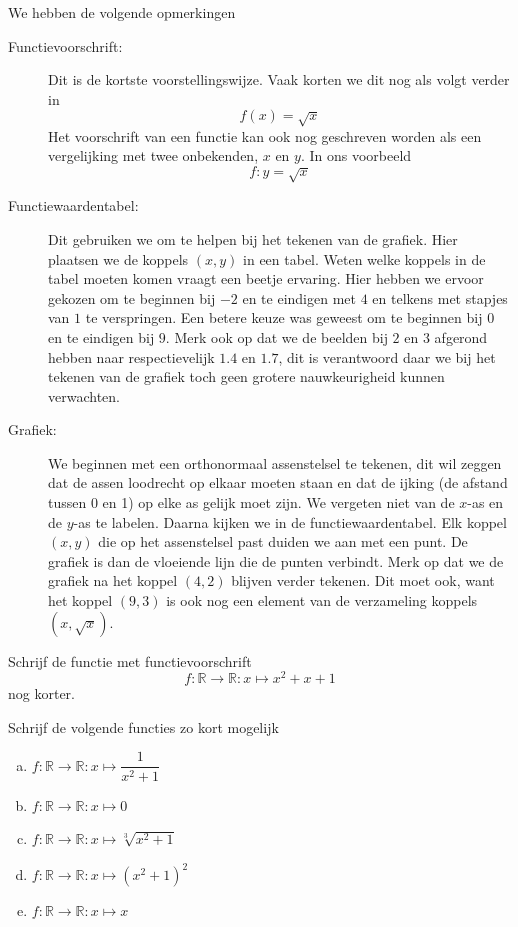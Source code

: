 \documentclass[12pt,a4paper,twoside]{article}
\begin{document}
We hebben de volgende opmerkingen
\begin{description}
\item[Functievoorschrift:] Dit is de kortste voorstellingswijze. Vaak korten we dit nog als volgt verder in
  $$f(x)=\sqrt{x}$$
  Het voorschrift van een functie kan ook nog geschreven worden als een vergelijking met twee onbekenden, $x$ en $y$. In ons voorbeeld
  $$f: y=\sqrt{x}$$
\item[Functiewaardentabel:] Dit gebruiken we om te helpen bij het tekenen van de grafiek. Hier plaatsen we de koppels $(x,y)$ in een tabel. Weten welke koppels in de tabel moeten komen vraagt een beetje ervaring. Hier hebben we ervoor gekozen om te beginnen bij $-2$ en te eindigen met $4$ en telkens met stapjes van $1$ te verspringen. Een betere keuze was geweest om te beginnen bij $0$ en te eindigen bij $9$. Merk ook op dat we de beelden bij $2$ en $3$ afgerond hebben naar respectievelijk $1.4$ en $1.7$, dit is verantwoord daar we bij het tekenen van de grafiek toch geen grotere nauwkeurigheid kunnen verwachten.
\item[Grafiek:] We beginnen met een orthonormaal assenstelsel te tekenen, dit wil zeggen dat de assen loodrecht op elkaar moeten staan en dat de ijking (de afstand tussen 0 en 1) op elke as gelijk moet zijn. We vergeten niet van de $x$-as en de $y$-as te labelen. Daarna kijken we in de functiewaardentabel. Elk koppel $(x,y)$ die op het assenstelsel past duiden we aan met een punt. De grafiek is dan de vloeiende lijn die de punten verbindt. Merk op dat we de grafiek na het koppel $(4,2)$ blijven verder tekenen. Dit moet ook, want het koppel $(9,3)$ is ook nog een element van de verzameling koppels $(x,\sqrt{x})$.
\end{description}

\begin{oefening}
  Schrijf de functie met functievoorschrift
  $$f:\mathbb{R}\to\mathbb{R}:x\mapsto x^2+x+1$$
  nog korter.
\end{oefening}

\begin{oefening}
  Schrijf de volgende functies zo kort mogelijk
  \begin{enumerate}[(a)]
  \itemsep.5em
  \item $f:\mathbb{R}\to\mathbb{R}:x\mapsto \dfrac{1}{x^2+1}$
  \item $f:\mathbb{R}\to\mathbb{R}:x\mapsto 0$
  \item $f:\mathbb{R}\to\mathbb{R}:x\mapsto \sqrt[3]{x^2+1}$
  \item $f:\mathbb{R}\to\mathbb{R}:x\mapsto \left(x^2+1\right)^2$
  \item $f:\mathbb{R}\to\mathbb{R}:x\mapsto x$
  \end{enumerate}
\end{oefening}
\end{document}
